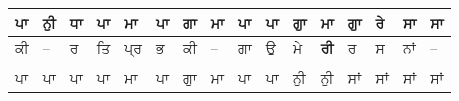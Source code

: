 \documentclass[10pt]{article}
\begin{document}
\begin{table}[!htb]
{\renewcommand{\arraystretch}{1.5}%
\begin{tabular}{llllllllllllllll}
\hline
\multicolumn{1}{|l|}{ਪਾ}          & \multicolumn{1}{l|}{ਨੁੀ}         & \multicolumn{1}{l|}{ਧਾ}           & \multicolumn{1}{l|}{ਪਾ}          & \multicolumn{1}{l|}{ਮਾ}           & \multicolumn{1}{l|}{ਪਾ}         & \multicolumn{1}{l|}{ਗਾ}          & \multicolumn{1}{l|}{ਮਾ}          & \multicolumn{1}{l|}{ਪਾ}           & \multicolumn{1}{l|}{ਪਾ}          & \multicolumn{1}{l|}{ਗੁਾ}         & \multicolumn{1}{l|}{ਮਾ}          & \multicolumn{1}{l|}{ਗੁਾ}         & \multicolumn{1}{l|}{ਰੇ}          & \multicolumn{1}{l|}{ਸਾ}           & \multicolumn{1}{l|}{ਸਾ}          \\ \hline
\multicolumn{1}{|l|}{\textsf{ਕੀ}} & \multicolumn{1}{l|}{\textsf{--}} & \multicolumn{1}{l|}{\textsf{ਰ}}   & \multicolumn{1}{l|}{\textsf{ਤਿ}} & \multicolumn{1}{l|}{\textsf{ਪ੍ਰ}} & \multicolumn{1}{l|}{\textsf{ਭ}} & \multicolumn{1}{l|}{\textsf{ਕੀ}} & \multicolumn{1}{l|}{\textsf{--}} & \multicolumn{1}{l|}{\textsf{ਗਾ}}  & \multicolumn{1}{l|}{\textsf{ਉ}}  & \multicolumn{1}{l|}{\textsf{ਮੇ}} & \multicolumn{1}{l|}{\bf{ਰੀ}} & \multicolumn{1}{l|}{\textsf{ਰ}}  & \multicolumn{1}{l|}{\textsf{ਸ}}  & \multicolumn{1}{l|}{\textsf{ਨਾਂ}} & \multicolumn{1}{l|}{\textsf{--}} \\ \hline
\multicolumn{16}{l}{}                                                                                                                                                                                                                                                                                                                                                                                                                                                                                                                                                             \\ \hline
\multicolumn{1}{|l|}{ਪਾ}          & \multicolumn{1}{l|}{ਪਾ}          & \multicolumn{1}{l|}{ਪਾ}           & \multicolumn{1}{l|}{ਪਾ}          & \multicolumn{1}{l|}{ਮਾ}           & \multicolumn{1}{l|}{ਪਾ}         & \multicolumn{1}{l|}{ਗੁਾ}         & \multicolumn{1}{l|}{ਮਾ}          & \multicolumn{1}{l|}{ਪਾ}           & \multicolumn{1}{l|}{ਪਾ}          & \multicolumn{1}{l|}{ਨੁੀ}         & \multicolumn{1}{l|}{ਨੁੀ}         & \multicolumn{1}{l|}{ਸਾਂ}         & \multicolumn{1}{l|}{ਸਾਂ}         & \multicolumn{1}{l|}{ਸਾਂ}          & \multicolumn{1}{l|}{ਸਾਂ}         \\ \hline

\end{tabular}}
\end{table}
\end{document}
